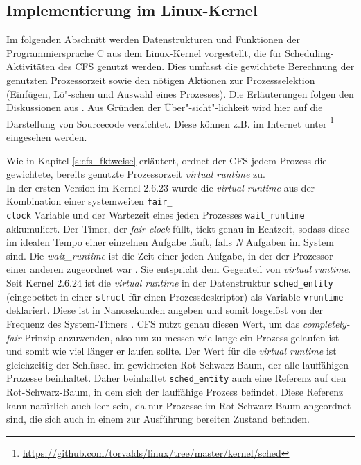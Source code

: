 \subsection{Implementierung im Linux-Kernel}\label{s:cstructs}
Im folgenden Abschnitt werden Datenstrukturen und Funktionen der Programmiersprache C aus dem Linux-Kernel vorgestellt, die für Scheduling-Aktivitäten des CFS genutzt werden. Dies umfasst die gewichtete Berechnung der genutzten Prozessorzeit sowie den nötigen Aktionen zur Prozessselektion (Einfügen, Lö"-schen und Auswahl eines Prozesses). Die Erläuterungen folgen den Diskussionen aus \cite{rlove}. Aus Gründen der Über"-sicht"-lichkeit wird hier auf die Darstellung von Sourcecode verzichtet. Diese können z.B. im Internet unter \footnote{\url{https://github.com/torvalds/linux/tree/master/kernel/sched}} eingesehen werden.

Wie in Kapitel \ref{s:cfs_fktweise} erläutert, ordnet der CFS jedem Prozess die gewichtete, bereits genutzte Prozessorzeit \textit{virtual runtime} zu. \\
In der ersten Version im Kernel 2.6.23 wurde die \textit{virtual runtime} aus der Kombination einer systemweiten \texttt{fair\_\\clock} Variable und der Wartezeit eines jeden Prozesses \texttt{wait\_runtime} akkumuliert. Der Timer, der \textit{fair clock} füllt, tickt genau in Echtzeit, sodass diese im idealen Tempo einer einzelnen Aufgabe läuft, falls \textit{N} Aufgaben im System sind. Die \textit{wait\_runtime} ist die Zeit einer jeden Aufgabe, in der der Prozessor einer anderen zugeordnet war \cite{cpabla}. Sie entspricht dem Gegenteil von \textit{virtual runtime}.\\
Seit Kernel 2.6.24 ist die \textit{virtual runtime} in der Datenstruktur \texttt{sched\_entity} (eingebettet in einer \texttt{struct} für einen Prozessdeskriptor) als Variable \texttt{vrun\-time} deklariert. Diese ist in Nanosekunden angeben und somit losgelöst von der Frequenz des System-Timers \cite{rlove}. CFS nutzt genau diesen Wert, um das \textit{completely-fair} Prinzip anzuwenden, also um zu messen wie lange ein Prozess gelaufen ist und somit wie viel länger er laufen sollte.
Der Wert für die \textit{virtual runtime} ist gleichzeitig der Schlüssel im gewichteten Rot-Schwarz-Baum, der alle lauffähigen Prozesse beinhaltet. Daher beinhaltet \texttt{sched\_entity} auch eine Referenz auf den Rot-Schwarz-Baum, in dem sich der lauffähige Prozess befindet. Diese Referenz kann natürlich auch leer sein, da nur Prozesse im Rot-Schwarz-Baum angeordnet sind, die sich auch in einem zur Ausführung bereiten Zustand befinden.


